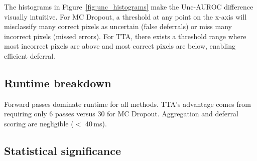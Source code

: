 The histograms in Figure~\ref{fig:unc_histograms} make the Unc-AUROC
difference visually intuitive. For MC Dropout, a threshold at any point
on the x-axis will misclassify many correct pixels as uncertain (false
deferrals) or miss many incorrect pixels (missed errors). For TTA, there
exists a threshold range where most incorrect pixels are above and most
correct pixels are below, enabling efficient deferral.

\subsection{Runtime breakdown}

\begin{table}[H]
\centering
\caption{Runtime breakdown per image (average over 20 DRIVE test images).
``Preprocessing'' includes resizing and normalization. ``Aggregation''
includes computing mean, variance, and entropy from multiple passes.}
\label{tab:runtime}
\small
\setlength{\tabcolsep}{4.6pt}
\end{table}

Forward passes dominate runtime for all methods. TTA's advantage comes
from requiring only 6 passes versus 30 for MC Dropout. Aggregation and
deferral scoring are negligible ($<$ 40\,ms).

\subsection{Statistical significance}

